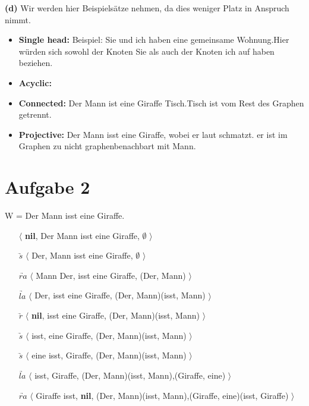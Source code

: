\documentclass[a4paper,10pt]{article}
\begin{document}
\newpage
\noindent \textbf{(d)} Wir werden hier Beispielsätze nehmen, da dies weniger Platz in Anspruch nimmt.
\begin{itemize}
 \item \textbf{Single head:} Beispiel: \dq Sie und ich haben eine gemeinsame Wohnung.\dq Hier würden sich sowohl der Knoten \dq Sie \dq als auch der Knoten \dq ich \dq auf \dq haben \dq
 beziehen.
 \item \textbf{Acyclic:}
 \item \textbf{Connected:} \dq Der Mann ist eine Giraffe Tisch.\dq \dq Tisch \dq ist vom Rest des Graphen getrennt.
 \item \textbf{Projective:} \dq Der Mann isst eine Giraffe, wobei er laut schmatzt. \dq er \dq ist im Graphen zu nicht graphenbenachbart mit Mann. 
\end{itemize}

\section*{Aufgabe 2}
W =  Der Mann isst eine Giraffe. 
\begin{itemize}
 \item[]  $\langle$ \textbf{nil}, Der Mann isst eine Giraffe, $\emptyset$ $\rangle$
 \item[$\underrightarrow{s}$] $\langle$ Der, Mann isst eine Giraffe, $\emptyset$ $\rangle$
 \item[$\underrightarrow{ra}$] $\langle$ Mann Der, isst eine Giraffe, {(Der, Mann)} $\rangle$
 \item[$\underrightarrow{la}$] $\langle$ Der, isst eine Giraffe, {(Der, Mann)(isst, Mann)} $\rangle$
 \item[$\underrightarrow{r}$] $\langle$ \textbf{nil}, isst eine Giraffe, {(Der, Mann)(isst, Mann)} $\rangle$
 \item[$\underrightarrow{s}$] $\langle$ isst, eine Giraffe, {(Der, Mann)(isst, Mann)} $\rangle$
 \item[$\underrightarrow{s}$] $\langle$ eine isst, Giraffe, {(Der, Mann)(isst, Mann)} $\rangle$
 \item[$\underrightarrow{la}$] $\langle$ isst, Giraffe, {(Der, Mann)(isst, Mann),(Giraffe, eine)} $\rangle$
 \item[$\underrightarrow{ra}$] $\langle$ Giraffe isst, \textbf{nil}, {(Der, Mann)(isst, Mann),(Giraffe, eine)(isst, Giraffe)} $\rangle$
\end{itemize}
\end{document}
